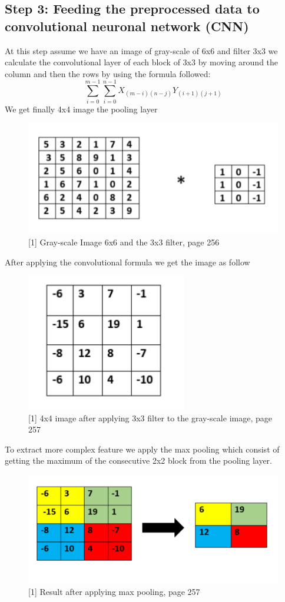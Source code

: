 \documentclass[12pt, letterpaper]{article}
\begin{document}
\subsection{Step 3: Feeding the preprocessed data to convolutional neuronal network (CNN)}
\par At this step assume we have an image of gray-scale of 6x6 and filter 3x3 we calculate the convolutional layer of each block of 3x3 by moving around the column and then the rows by using the formula followed:
$$ \sum_{i=0}^{m-1}\sum_{i=0}^{n-1} X_{(m-i)(n-j)}Y_{(i+1)(j+1)}$$
We get finally 4x4 image the pooling layer 
\begin{figure}[H]
    \includegraphics[width=\linewidth]{images/convolution.png}
    \caption{[1] Gray-scale Image 6x6 and the 3x3 filter, page 256}
    \label{fig:L1}
\end{figure}
After applying the convolutional formula we get the image as follow
\begin{figure}[H]
    \includegraphics[width=7cm,height=6cm]{images/pooling.png}
    \caption{[1] 4x4 image after applying 3x3 filter to the gray-scale image, page 257}
    \label{fig:L1}
\end{figure}
To extract more complex feature we apply the max pooling which consist of getting the maximum of the consecutive 2x2 block from the pooling layer.
\begin{figure}[H]
    \includegraphics[width=\linewidth]{images/maxpooling.png}
    \caption{[1] Result after applying max pooling, page 257}
    \label{fig:L1}
\end{figure}
\end{document}
